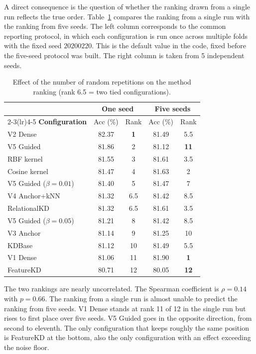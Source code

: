 A direct consequence is the question of whether the ranking drawn from
a single run reflects the true order. Table~\ref{tab:daohang} compares
the ranking from a single run with the ranking from five seeds. The
left column corresponds to the common reporting protocol, in which each
configuration is run once across multiple folds with the fixed seed
$20200220$. This is the default value in the code, fixed before the
five-seed protocol was built. The right column is taken from 5
independent seeds.

\begin{table}[!htbp]
\centering
\caption{Effect of the number of random repetitions on the method
ranking (rank 6.5 = two tied configurations).}
\label{tab:daohang}
\begin{tabular}{lcccc}
\toprule
& \multicolumn{2}{c}{\textbf{One seed}} & \multicolumn{2}{c}{\textbf{Five seeds}} \\
\cmidrule(lr){2-3}\cmidrule(lr){4-5}
\textbf{Configuration} & Acc (\%) & Rank & Acc (\%) & Rank \\
\midrule
V2 Dense & 82.37 & \textbf{1} & 81.49 & 5.5 \\
V5 Guided & 81.86 & 2 & 81.12 & \textbf{11} \\
RBF kernel & 81.55 & 3 & 81.61 & 3.5 \\
Cosine kernel & 81.47 & 4 & 81.63 & 2 \\
V5 Guided ($\beta = 0.01$) & 81.40 & 5 & 81.47 & 7 \\
V4 Anchor+kNN & 81.32 & 6.5 & 81.42 & 8.5 \\
RelationalKD & 81.32 & 6.5 & 81.61 & 3.5 \\
V5 Guided ($\beta = 0.05$) & 81.21 & 8 & 81.42 & 8.5 \\
V3 Anchor & 81.14 & 9 & 81.25 & 10 \\
KDBase & 81.12 & 10 & 81.49 & 5.5 \\
V1 Dense & 81.06 & 11 & 81.90 & \textbf{1} \\
FeatureKD & 80.71 & 12 & 80.05 & \textbf{12} \\
\bottomrule
\end{tabular}
\end{table}
\FloatBarrier

The two rankings are nearly uncorrelated. The Spearman coefficient is
$\rho = 0.14$ with $p = 0.66$. The ranking from a single run is almost
unable to predict the ranking from five seeds. V1 Dense stands at rank
11 of 12 in the single run but rises to first place over five seeds. V5
Guided goes in the opposite direction, from second to eleventh. The
only configuration that keeps roughly the same position is FeatureKD at
the bottom, also the only configuration with an effect exceeding the
noise floor.

